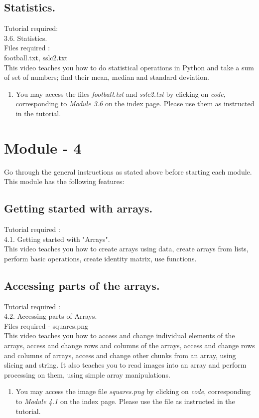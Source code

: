 \documentclass[11pt,twocolumn]{article}
\newenvironment{enumcpt}{\begin{enumerate} \topsep 0pt \partopsep 0pt 
                        \parsep 0pt
                        \itemsep 0pt \leftmargin -1in \rightmargin 0pt
                        }{\end{enumerate}}
\begin{document}
\subsection{Statistics.}
Tutorial required: \\ 3.6. Statistics. \\
Files required :\\ football.txt, sslc2.txt \\
This video teaches you how to do statistical operations in Python and take a sum of set of numbers; find their mean, median and standard deviation. \\
\begin{enumcpt}
\item You may access the files \emph{football.txt} and \emph{sslc2.txt} by clicking on \emph{code}, corresponding to \emph{Module 3.6} on the index page. Please use them as instructed in the tutorial. 
\end{enumcpt}


\section{Module - 4}
Go through the general instructions as stated above before starting each module.\\
This module has the following features:
\subsection{Getting started with arrays.}
Tutorial required : \\ 4.1. Getting started with "Arrays". \\
This video teaches you how to create arrays using data, create arrays from lists, perform basic operations, create identity matrix, use functions.
\subsection{Accessing parts of the arrays.}

Tutorial required : \\ 4.2. Accessing parts of Arrays. \\
Files required - squares.png\\
This video teaches you how to access and change individual elements of the arrays, access and change rows and columns of the arrays, access and change rows and columns of arrays, access and change other chunks from an array, using slicing and string. It also teaches you to read images into an array and perform processing on them, using simple array manipulations.
\begin{enumcpt}
\item You may access the image file \emph{squares.png} by clicking on \emph{code}, corresponding to \emph{Module 4.1} on the index page. Please use the file as instructed in the tutorial. 
\end{enumcpt}
 
\end{document}
